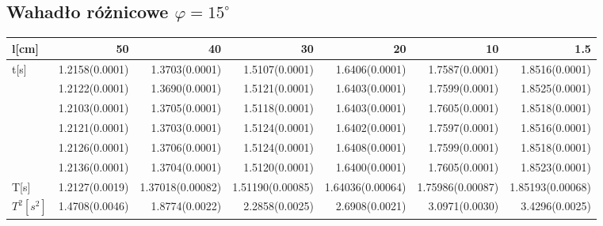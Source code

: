 \documentclass[a4paper,10pt]{article}
\begin{document}
\subsection{Wahadło różnicowe $\varphi = 15^\circ$}
\begin{tabular}{lrrrrrr}
\toprule
l[cm] &  50 &  40 &   30 &   20 &   10 &  1.5 \\
\midrule
t[s] &  1.2158(0.0001) &  1.3703(0.0001) &  1.5107(0.0001) &  1.6406(0.0001) &  1.7587(0.0001) &  1.8516(0.0001) \\
 &  1.2122(0.0001) &  1.3690(0.0001) &  1.5121(0.0001) &  1.6403(0.0001) &  1.7599(0.0001) &  1.8525(0.0001) \\
 &  1.2103(0.0001) &  1.3705(0.0001) &  1.5118(0.0001) &  1.6403(0.0001) &  1.7605(0.0001) &  1.8518(0.0001) \\
 &  1.2121(0.0001) &  1.3703(0.0001) &  1.5124(0.0001) &  1.6402(0.0001) &  1.7597(0.0001) &  1.8516(0.0001) \\
 &  1.2126(0.0001) &  1.3706(0.0001) &  1.5124(0.0001) &  1.6408(0.0001) &  1.7599(0.0001) &  1.8518(0.0001) \\
 &  1.2136(0.0001) &  1.3704(0.0001) &  1.5120(0.0001) &  1.6400(0.0001) &  1.7605(0.0001) &  1.8523(0.0001) \\\hline
T[s] &  1.2127(0.0019) & 1.37018(0.00082)  & 1.51190(0.00085)  & 1.64036(0.00064)  & 1.75986(0.00087)  
& 1.85193(0.00068) & \\\hline
$T^2[s^2]$ &  1.4708(0.0046) & 1.8774(0.0022)  & 2.2858(0.0025)  & 2.6908(0.0021)  & 3.0971(0.0030)  & 3.4296(0.0025) & \\
\bottomrule
\end{tabular}
\end{document}
